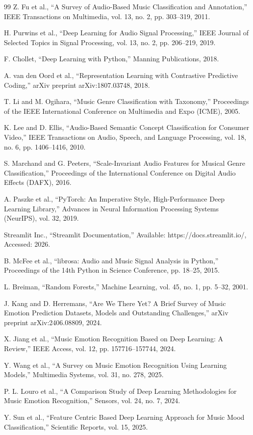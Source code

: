 \documentclass[12pt,a4paper]{report}
\begin{document}
\begin{thebibliography}{99}
Z. Fu et al., ``A Survey of Audio-Based Music Classification and Annotation,'' IEEE Transactions on Multimedia, vol. 13, no. 2, pp. 303--319, 2011.

H. Purwins et al., ``Deep Learning for Audio Signal Processing,'' IEEE Journal of Selected Topics in Signal Processing, vol. 13, no. 2, pp. 206--219, 2019.

F. Chollet, ``Deep Learning with Python,'' Manning Publications, 2018.

A. van den Oord et al., ``Representation Learning with Contrastive Predictive Coding,'' arXiv preprint arXiv:1807.03748, 2018.

T. Li and M. Ogihara, ``Music Genre Classification with Taxonomy,'' Proceedings of the IEEE International Conference on Multimedia and Expo (ICME), 2005.

K. Lee and D. Ellis, ``Audio-Based Semantic Concept Classification for Consumer Video,'' IEEE Transactions on Audio, Speech, and Language Processing, vol. 18, no. 6, pp. 1406--1416, 2010.

S. Marchand and G. Peeters, ``Scale-Invariant Audio Features for Musical Genre Classification,'' Proceedings of the International Conference on Digital Audio Effects (DAFX), 2016.

A. Paszke et al., ``PyTorch: An Imperative Style, High-Performance Deep Learning Library,'' Advances in Neural Information Processing Systems (NeurIPS), vol. 32, 2019.

Streamlit Inc., ``Streamlit Documentation,'' Available: https://docs.streamlit.io/, Accessed: 2026.

B. McFee et al., ``librosa: Audio and Music Signal Analysis in Python,'' Proceedings of the 14th Python in Science Conference, pp. 18--25, 2015.

L. Breiman, ``Random Forests,'' Machine Learning, vol. 45, no. 1, pp. 5--32, 2001.

J. Kang and D. Herremans, ``Are We There Yet? A Brief Survey of Music Emotion Prediction Datasets, Models and Outstanding Challenges,'' arXiv preprint arXiv:2406.08809, 2024.

X. Jiang et al., ``Music Emotion Recognition Based on Deep Learning: A Review,'' IEEE Access, vol. 12, pp. 157716--157744, 2024.

Y. Wang et al., ``A Survey on Music Emotion Recognition Using Learning Models,'' Multimedia Systems, vol. 31, no. 278, 2025.

P. L. Louro et al., ``A Comparison Study of Deep Learning Methodologies for Music Emotion Recognition,'' Sensors, vol. 24, no. 7, 2024.

Y. Sun et al., ``Feature Centric Based Deep Learning Approach for Music Mood Classification,'' Scientific Reports, vol. 15, 2025.

\end{thebibliography}
\end{document}
